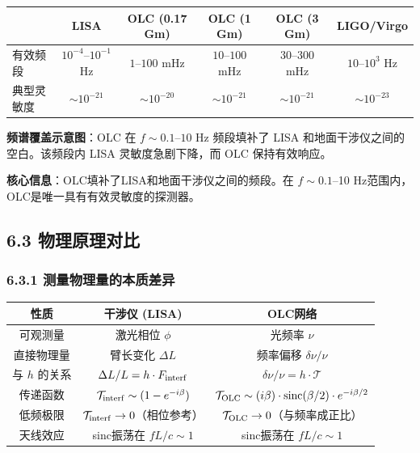 \documentclass[12pt,a4paper]{article}
\begin{document}
\vspace{1em}
\noindent\begin{minipage}{\textwidth}
\small
\begin{center}
\begin{tabular}{l c c c c c}
 & LISA & OLC (0.17 Gm) & OLC (1 Gm) & OLC (3 Gm) & LIGO/Virgo \\
\hline
有效频段 & $10^{-4}$--$10^{-1}$ Hz & $1$--$100$ mHz & $10$--$100$ mHz & $30$--$300$ mHz & $10$--$10^3$ Hz \\
典型灵敏度 & $\sim 10^{-21}$ & $\sim 10^{-20}$ & $\sim 10^{-21}$ & $\sim 10^{-21}$ & $\sim 10^{-23}$ \\
\end{tabular}
\end{center}

\noindent\textbf{频谱覆盖示意图}：OLC 在 $f \sim 0.1$--$10$ Hz 频段填补了 LISA 和地面干涉仪之间的空白。该频段内 LISA 灵敏度急剧下降，而 OLC 保持有效响应。
\end{minipage}

\textbf{核心信息}：OLC填补了LISA和地面干涉仪之间的频段。在 $f \sim 0.1$–10 Hz范围内，OLC是唯一具有有效灵敏度的探测器。

\subsection{6.3 物理原理对比}


\subsubsection{6.3.1 测量物理量的本质差异}


\begin{tabular}{|c|c|c|}
\hline
性质 & 干涉仪 (LISA) & OLC网络 \\
\hline
可观测量 & 激光相位 $\phi$ & 光频率 $\nu$ \\
直接物理量 & 臂长变化 $\Delta L$ & 频率偏移 $\delta\nu/\nu$ \\
与 $h$ 的关系 & $\Delta L/L = h \cdot F_{\rm interf}$ & $\delta\nu/\nu = h \cdot \mathcal{T}$ \\
传递函数 & $\mathcal{T}_{\rm interf} \sim (1 - e^{-i\beta})$ & $\mathcal{T}_{\rm OLC} \sim (i\beta) \cdot {\rm sinc}(\beta/2) \cdot e^{-i\beta/2}$ \\
低频极限 & $\mathcal{T}_{\rm interf} \to 0$（相位参考） & $\mathcal{T}_{\rm OLC} \to 0$（与频率成正比） \\
天线效应 & sinc振荡在 $fL/c \sim 1$ & sinc振荡在 $fL/c \sim 1$ \\
\hline
\end{tabular}
\end{document}
